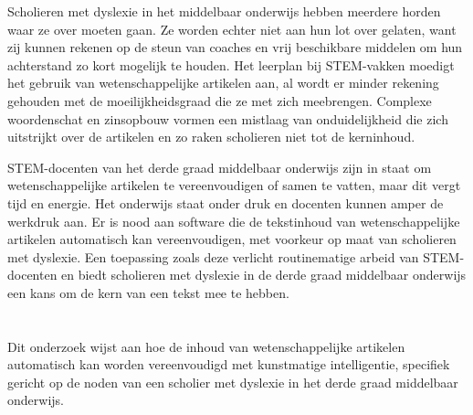 
Scholieren met dyslexie in het middelbaar onderwijs hebben meerdere horden waar ze over moeten gaan. Ze worden echter niet aan hun lot over gelaten, want zij kunnen rekenen op de steun van coaches en vrij beschikbare middelen om hun achterstand zo kort mogelijk te houden. Het leerplan bij STEM-vakken moedigt het gebruik van wetenschappelijke artikelen aan, al wordt er minder rekening gehouden met de moeilijkheidsgraad die ze met zich meebrengen. Complexe woordenschat en zinsopbouw vormen een mistlaag van onduidelijkheid die zich uitstrijkt over de artikelen en zo raken scholieren niet tot de kerninhoud.


STEM-docenten van het derde graad middelbaar onderwijs zijn in staat om wetenschappelijke artikelen te vereenvoudigen of samen te vatten, maar dit vergt tijd en energie. Het onderwijs staat onder druk en docenten kunnen amper de werkdruk aan. Er is nood aan software die de tekstinhoud van wetenschappelijke artikelen automatisch kan vereenvoudigen, met voorkeur op maat van scholieren met dyslexie. Een toepassing zoals deze verlicht routinematige arbeid van STEM-docenten en biedt scholieren met dyslexie in de derde graad middelbaar onderwijs een kans om de kern van een tekst mee te hebben.


\section{}%
\label{sec:onderzoeksvraag}



Dit onderzoek wijst aan hoe de inhoud van wetenschappelijke artikelen automatisch kan worden vereenvoudigd met kunstmatige intelligentie, specifiek gericht op de noden van een scholier met dyslexie in het derde graad middelbaar onderwijs.

